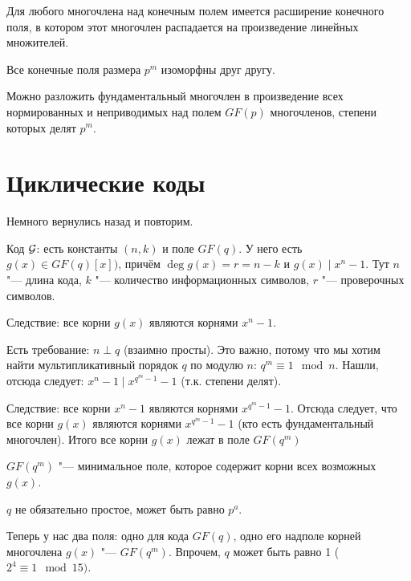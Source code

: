 \begin{theorem}
	Для любого многочлена над конечным полем имеется расширение конечного поля,
	в котором этот многочлен распадается на произведение линейных множителей.
\end{theorem}

\begin{theorem}
	Все конечные поля размера $p^m$ изоморфны друг другу.
\end{theorem}

\begin{theorem}
	Можно разложить фундаментальный многочлен в произведение
	всех нормированных и неприводимых над полем $GF(p)$ многочленов,
	степени которых делят $p^m$.
\end{theorem}

\section{Циклические коды}
Немного вернулись назад и повторим.

Код $\cal G$: есть константы $(n, k)$ и поле $GF(q)$.
У него есть $g(x) \in GF(q)[x])$,
причём $\deg g(x) = r = n - k$ и $g(x) \mid x^n - 1$.
Тут $n$ "--- длина кода, $k$ "--- количество информационных символов,
$r$ "--- проверочных символов.

Следствие: все корни $g(x)$ являются корнями $x^n-1$.

Есть требование: $n \perp q$ (взаимно просты).
Это важно, потому что мы хотим найти мультипликативный
порядок $q$ по модулю $n$: $q^m \equiv 1 \mod n$.
Нашли, отсюда следует: $x^n-1 \mid x^{q^m-1}-1$ (т.к. степени делят).

Следствие: все корни $x^n-1$ являются корнями $x^{q^m-1}-1$.
Отсюда следует, что все корни $g(x)$ являются корнями  $x^{q^m-1}-1$ (кто есть фундаментальный многочлен).
Итого все корни $g(x)$ лежат в поле $GF(q^m)$
\begin{lemma}
$GF(q^m)$ "--- минимальное поле, которое содержит корни всех возможных $g(x)$.
\end{lemma}
\begin{Rem}
$q$ не обязательно простое, может быть равно $p^a$.
\end{Rem}

\begin{Rem}
	Теперь у нас два поля: одно для кода $GF(q)$, одно его надполе
	корней многочлена $g(x)$ "--- $GF(q^m)$.
	Впрочем, $q$ может быть равно 1 ($2^4\equiv 1 \mod 15)$.
\end{Rem}

